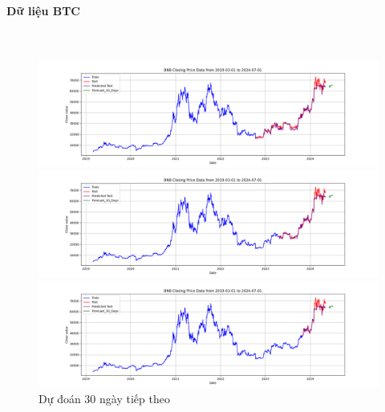 \documentclass[conference]{IEEEtran}
\begin{document}
\paragraph{\textbf{Dữ liệu BTC}} \mbox{} \\
\begin{figure}[H]
    \centering
    \begin{minipage}{0.15\textwidth}
    \centering
    \includegraphics[width=1\textwidth]{Figure/RandomForest_BTC_30days_73.png}
    \end{minipage}
    \hfill
    \begin{minipage}{0.15\textwidth}
    \centering
    \includegraphics[width=1\textwidth]{Figure/RandomForest_BTC_30days_82.png}
    \end{minipage}
    \hfill
    \begin{minipage}{0.15\textwidth}
    \centering
    \includegraphics[width=1\textwidth]{Figure/RandomForest_BTC_30days_91.png}
    \end{minipage}
    \caption{Dự đoán 30 ngày tiếp theo}
    \label{fig:1}
\end{figure}
\end{document}
